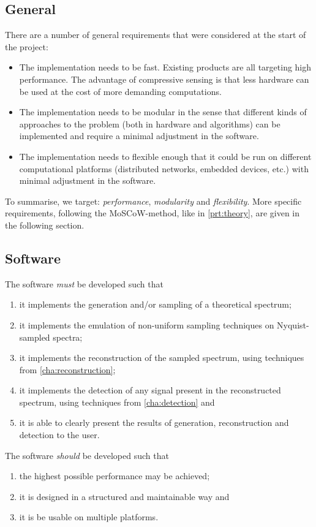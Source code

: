 \documentclass[a4paper, openany, oneside]{memoir}
\begin{document}
\subsection{General}
There are a number of general requirements that were considered at the start of the project:
\begin{itemize}
    \item The implementation needs to be fast. Existing products are all targeting high performance. The advantage of compressive sensing is that less hardware can be used at the cost of more demanding computations.
    \item The implementation needs to be modular in the sense that different kinds of approaches to the problem (both in hardware and algorithms) can be implemented and require a minimal adjustment in the software.
    \item The implementation needs to flexible enough that it could be run on different computational platforms (distributed networks, embedded devices, etc.) with minimal adjustment in the software.
\end{itemize}

To summarise, we target: \emph{performance}, \emph{modularity} and \emph{flexibility}. More specific requirements, following the MoSCoW-method, like in \cref{prt:theory}, are given in the following section.

\subsection{Software}
The software \emph{must} be developed such that
\begin{enumerate}
    \item it implements the generation and/or sampling of a theoretical spectrum;
    \item it implements the emulation of non-uniform sampling techniques on Nyquist-sampled spectra;
    \item it implements the reconstruction of the sampled spectrum, using techniques from \cref{cha:reconstruction};
    \item it implements the detection of any signal present in the reconstructed spectrum, using techniques from \cref{cha:detection} and
    \item it is able to clearly present the results of generation, reconstruction and detection to the user.
\end{enumerate}
The software \emph{should} be developed such that
\begin{enumerate}
    \item the highest possible performance may be achieved;
    \item it is designed in a structured and maintainable way and
    \item it is be usable on multiple platforms.
\end{enumerate}
\end{document}
